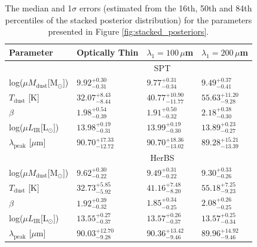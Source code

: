 \begin{table}
    \centering
    \begin{tabular}{p{3.5cm}p{2.5cm}p{2.5cm}p{2.5cm}}
	\hline
	\hline
	Parameter & Optically Thin & $\lambda_1 = 100\,\mu$m & $\lambda_1 = 200\,\mu$m \\
	\hline
	\hline
	& \multicolumn{3}{c}{SPT} \\
	\hline
	log($\mu M_{\textrm{dust}} [$M$_\odot]$) & $9.92_{-0.31}^{+0.30}$ & $9.77_{-0.34}^{+0.31}$ & $9.49_{-0.41}^{+0.37}$ \\
	$T_{\textrm{dust}}$ [K] & $32.07_{-8.44}^{+8.43}$ & $40.77_{-11.77}^{+10.90}$ & $55.63_{-9.28}^{+11.20}$ \\
	$\beta$ & $1.98_{-0.39}^{+0.54}$ & $1.91_{-0.32}^{+0.50}$ & $2.18_{-0.30}^{+0.38}$ \\
	log($\mu L_{\textrm{IR}} [$L$_\odot]$) & $13.98_{-0.31}^{+0.19}$ & $13.99_{-0.30}^{+0.19}$ & $13.89_{-0.27}^{+0.23}$ \\
	$\lambda_{\textrm{peak}}$ [$\mu$m] & $90.70_{-12.72}^{+17.33}$ & $90.70_{-13.02}^{+18.36}$ & $89.28_{-13.39}^{+15.21}$ \\
	
	\hline
	& \multicolumn{3}{c}{HerBS} \\
	\hline
	
	log($\mu M_{\textrm{dust}} [$M$_\odot]$) & $9.62_{-0.22}^{+0.30}$ & $9.49_{-0.22}^{+0.31}$ & $9.30_{-0.26}^{+0.33}$ \\
	$T_{\textrm{dust}}$ [K] & $32.73_{-5.92}^{+5.85}$ & $41.16_{-8.20}^{+7.48}$ & $55.18_{-9.23}^{+7.25}$ \\
	$\beta$ & $1.92_{-0.32}^{+0.39}$ & $1.85_{-0.25}^{+0.34}$ & $2.08_{-0.25}^{+0.26}$ \\
	log($\mu L_{\textrm{IR}} [$L$_\odot]$) & $13.55_{-0.37}^{+0.27}$ & $13.57_{-0.37}^{+0.26}$ & $13.57_{-0.34}^{+0.25}$ \\
	$\lambda_{\textrm{peak}}$ [$\mu$m] & $90.03_{-9.28}^{+12.70}$ & $90.36_{-9.46}^{+13.42}$ & $89.96_{-9.46}^{+14.92}$ \\
	\hline
    \end{tabular}
	\caption[Median values of far-IR to mm SED parameters]{The median and 1$\sigma$ errors (estimated from the 16th, 50th and 84th percentiles of the stacked posterior distribution) for the parameters presented in Figure \ref{fig:stacked_posteriors}.}
    \label{tab:parameter_results}
\end{table}

